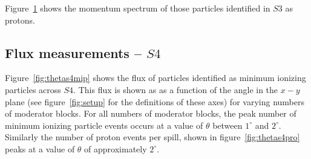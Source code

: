 	Figure~\ref{fig:s3promom} shows the momentum spectrum of those particles identified in $S3$ as protons.

	\begin{figure}[ht]
		\centering
		\begin{adjustbox}{max totalsize={0.8\textwidth}, center}
			
		\end{adjustbox}
		\label{fig:s3promom}
	\end{figure}

	\subsection{Flux measurements -- $S4$}

   
	Figure~\ref{fig:thetas4mip} shows the flux of particles identified as minimum ionizing particles across $S4$.
	This flux is shown as as a function of the angle in the $x-y$ plane (see figure~\ref{fig:setup} for the definitions of these axes) for varying numbers of moderator blocks.
	For all numbers of moderator blocks, the peak number of minimum ionizing particle events occurs at a value of $\theta$ between $1^{\circ}$ and $2^{\circ}$.
	Similarly the number of proton events per spill, shown in figure~\ref{fig:thetas4pro} peaks at a value of $\theta$ of approximately $2^{\circ}$.
	
